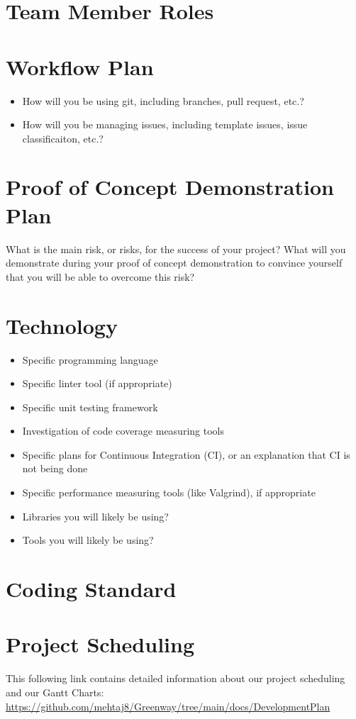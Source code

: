 \documentclass{article}
\begin{document}
\section{Team Member Roles}

\section{Workflow Plan}

\begin{itemize}
	\item How will you be using git, including branches, pull request, etc.?
	\item How will you be managing issues, including template issues, issue
	classificaiton, etc.?
\end{itemize}

\section{Proof of Concept Demonstration Plan}

What is the main risk, or risks, for the success of your project?  What will you
demonstrate during your proof of concept demonstration to convince yourself that
you will be able to overcome this risk?

\section{Technology}

\begin{itemize}
\item Specific programming language
\item Specific linter tool (if appropriate)
\item Specific unit testing framework
\item Investigation of code coverage measuring tools
\item Specific plans for Continuous Integration (CI), or an explanation that CI
  is not being done
\item Specific performance measuring tools (like Valgrind), if
  appropriate
\item Libraries you will likely be using?
\item Tools you will likely be using?
\end{itemize}

\section{Coding Standard}

\section{Project Scheduling}
This following link contains detailed information about our project scheduling and our Gantt Charts:\\
\url{https://github.com/mehtaj8/Greenway/tree/main/docs/DevelopmentPlan}
\end{document}
